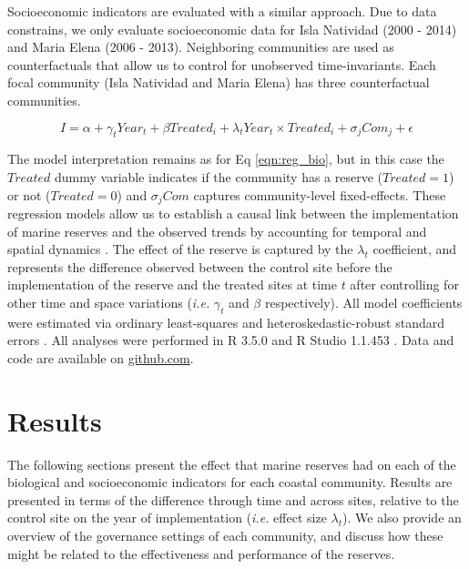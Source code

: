 \documentclass{frontiersSCNS}
\theoremstyle{definition}
\theoremstyle{definition}
\theoremstyle{definition}
\theoremstyle{remark}
\begin{document}
Socioeconomic indicators are evaluated with a similar approach. Due to
data constrains, we only evaluate socioeconomic data for Isla Natividad
(2000 - 2014) and Maria Elena (2006 - 2013). Neighboring communities are
used as counterfactuals that allow us to control for unobserved
time-invariants. Each focal community (Isla Natividad and Maria Elena)
has three counterfactual communities.

\begin{equation}
I = \alpha + \gamma_{t} Year_t + \beta Treated_i + \lambda_{t} Year_t\times Treated_i + \sigma_jCom_j +\epsilon
\label{eqn:soc_reg}
\end{equation}

The model interpretation remains as for Eq \ref{eqn:reg_bio}, but in
this case the \(Treated\) dummy variable indicates if the community has
a reserve (\(Treated = 1\)) or not (\(Treated = 0\)) and \(\sigma_jCom\)
captures community-level fixed-effects. These regression models allow us
to establish a causal link between the implementation of marine reserves
and the observed trends by accounting for temporal and spatial dynamics
\citep{depalma_2018}. The effect of the reserve is captured by the
\(\lambda_t\) coefficient, and represents the difference observed
between the control site before the implementation of the reserve and
the treated sites at time \(t\) after controlling for other time and
space variations (\emph{i.e.} \(\gamma_t\) and \(\beta\) respectively).
All model coefficients were estimated via ordinary least-squares and
heteroskedastic-robust standard errors \citep{zeileis_2004-7n}. All
analyses were performed in R 3.5.0 and R Studio 1.1.453 \citep{R_2018}.
Data and code are available on
\href{https://github.com/jcvdav/ReserveEffect}{github.com}.

\section{Results}\label{results}

The following sections present the effect that marine reserves had on
each of the biological and socioeconomic indicators for each coastal
community. Results are presented in terms of the difference through time
and across sites, relative to the control site on the year of
implementation (\emph{i.e.} effect size \(\lambda_t\)). We also provide
an overview of the governance settings of each community, and discuss
how these might be related to the effectiveness and performance of the
reserves.
\end{document}
